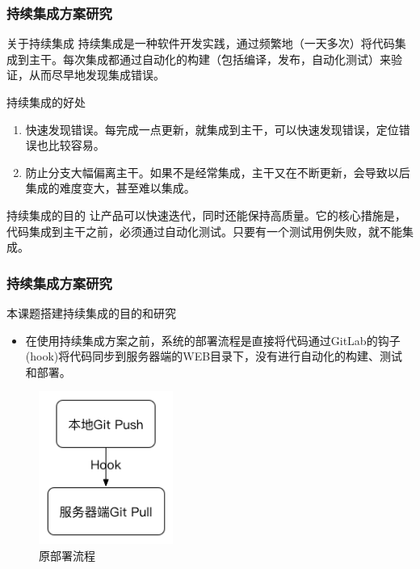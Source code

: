 \documentclass{beamer}
\begin{document}
\begin{frame}
\frametitle{持续集成方案研究}
  \begin{block}{关于持续集成}
    持续集成是一种软件开发实践，通过频繁地（一天多次）将代码集成到主干。每次集成都通过自动化的构建（包括编译，发布，自动化测试）来验证，从而尽早地发现集成错误\cite{jenkins1}。
  \end{block}
  \pause
  \begin{block}{持续集成的好处\cite{jenkins2}}
    \begin{enumerate}
      \item 快速发现错误。每完成一点更新，就集成到主干，可以快速发现错误，定位错误也比较容易。
      \item 防止分支大幅偏离主干。如果不是经常集成，主干又在不断更新，会导致以后集成的难度变大，甚至难以集成。
    \end{enumerate}
  \end{block}
  \pause
  \begin{block}{持续集成的目的}
    让产品可以快速迭代，同时还能保持高质量。它的核心措施是，代码集成到主干之前，必须通过自动化测试。只要有一个测试用例失败，就不能集成。
  \end{block}
\end{frame}

\begin{frame}
\frametitle{持续集成方案研究}
  \begin{block}{本课题搭建持续集成的目的和研究}
    \begin{itemize}
      \item 在使用持续集成方案之前，系统的部署流程是直接将代码通过GitLab的钩子(hook)将代码同步到服务器端的WEB目录下，没有进行自动化的构建、测试和部署。
    \end{itemize} 
  \end{block}
  \begin{figure}
    \centering
      \includegraphics[height=5cm]{./img/jenkins1.png}
    \caption{原部署流程}
    \label{fig:visual}
  \end{figure}
\end{frame}
\end{document}

